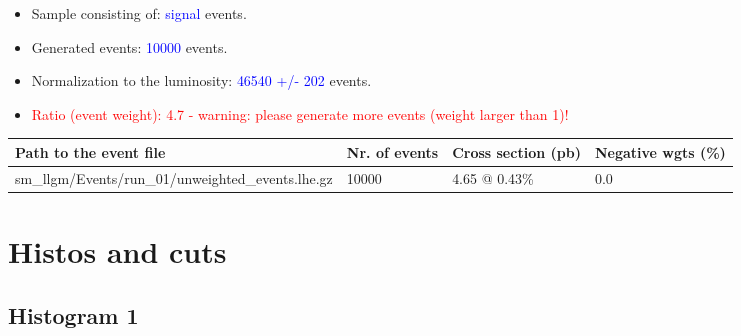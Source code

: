 \documentclass[a4paper, 10pt]{article}
\begin{document}
\begin{itemize}
  \item Sample consisting of: \textcolor{blue}{signal}  events.
   \item Generated events: \textcolor{blue}{10000 }  events.
   \item Normalization to the luminosity: \textcolor{blue}{46540}\textcolor{blue}{ +/\-- }\textcolor{blue}{202 }  events.
   \item\textcolor{red}{Ratio (event weight): }\textcolor{red}{4.7 }\textcolor{red}{ - warning: please generate more events (weight larger than 1)!}
\textcolor{red}{}
\end{itemize}
\begin{table}[H]
  \begin{center}
    \begin{tabular}{|m{55.0mm}|m{25.0mm}|m{30.0mm}|m{30.0mm}|}
      \hline
      {\cellcolor{yellow}         Path to the event file}& {\cellcolor{yellow}         Nr. of events}& {\cellcolor{yellow}         Cross section (pb)}& {\cellcolor{yellow}         Negative wgts (\%)}\\
      \hline
      {\cellcolor{white}          sm\_llgm/\-Events/\-run\_01/\-unweighted\_events.lhe.gz}& {\cellcolor{white}          10000}& {\cellcolor{white}          4.65 @ 0.43\%}& {\cellcolor{white}          0.0}\\
\hline
    \end{tabular}
  \end{center}
\end{table}

\newpage
\section{ Histos and cuts}

\subsection{ Histogram 1}
\end{document}
